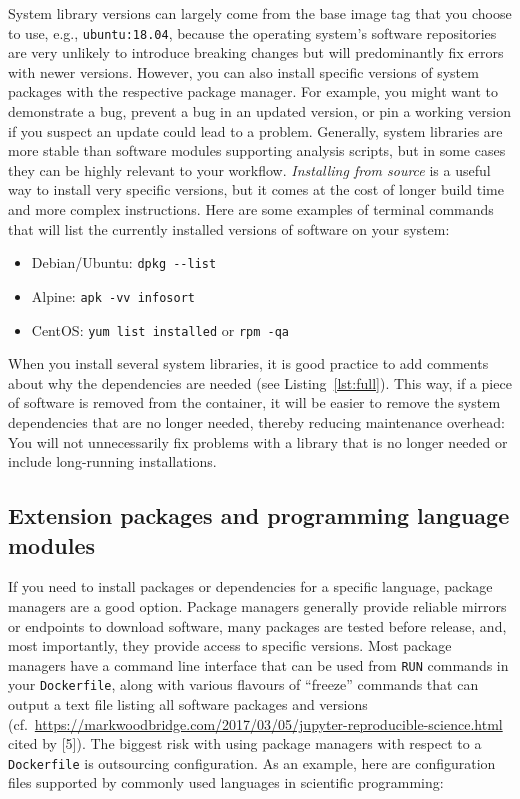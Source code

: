 \documentclass[10pt,letterpaper]{article}
\providecommand{\tightlist}{%
  \setlength{\itemsep}{0pt}\setlength{\parskip}{0pt}}
\begin{document}
System library versions can largely come from the base image tag that
you choose to use, e.g., \texttt{ubuntu:18.04}, because the operating
system's software repositories are very unlikely to introduce breaking
changes but will predominantly fix errors with newer versions. However,
you can also install specific versions of system packages with the
respective package manager. For example, you might want to demonstrate a
bug, prevent a bug in an updated version, or pin a working version if
you suspect an update could lead to a problem. Generally, system
libraries are more stable than software modules supporting analysis
scripts, but in some cases they can be highly relevant to your workflow.
\emph{Installing from source} is a useful way to install very specific
versions, but it comes at the cost of longer build time and more complex
instructions. Here are some examples of terminal commands that will list
the currently installed versions of software on your system:

\begin{itemize}
\tightlist
\item
  Debian/Ubuntu: \texttt{dpkg\ -\/-list}
\item
  Alpine: \texttt{apk\ -vv\ info\textbar{}sort}
\item
  CentOS: \texttt{yum\ list\ installed} or \texttt{rpm\ -qa}
\end{itemize}

When you install several system libraries, it is good practice to add
comments about why the dependencies are needed (see
Listing~\ref{lst:full}). This way, if a piece of software is removed
from the container, it will be easier to remove the system dependencies
that are no longer needed, thereby reducing maintenance overhead: You
will not unnecessarily fix problems with a library that is no longer
needed or include long-running installations.

\hypertarget{extension-packages-and-programming-language-modules}{%
\subsection{Extension packages and programming language
modules}\label{extension-packages-and-programming-language-modules}}

If you need to install packages or dependencies for a specific language,
package managers are a good option. Package managers generally provide
reliable mirrors or endpoints to download software, many packages are
tested before release, and, most importantly, they provide access to
specific versions. Most package managers have a command line interface
that can be used from \texttt{RUN} commands in your \texttt{Dockerfile},
along with various flavours of ``freeze'' commands that can output a
text file listing all software packages and versions
(cf.~\url{https://markwoodbridge.com/2017/03/05/jupyter-reproducible-science.html}
cited by {[}5{]}). The biggest risk with using package managers with
respect to a \texttt{Dockerfile} is outsourcing configuration. As an
example, here are configuration files supported by commonly used
languages in scientific programming:
\end{document}
